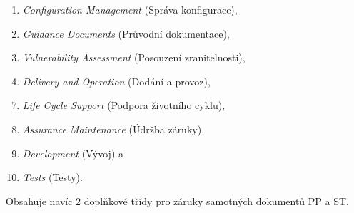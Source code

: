 \documentclass[10pt,a4paper]{article}
\begin{document}
	\begin{minipage}{0.50\textwidth}
		\begin{enumerate}
			\item \textit{Configuration Management} (Správa konfigurace), 
			\item \textit{Guidance Documents} (Průvodní dokumentace), 
			\item \textit{Vulnerability Assessment} (Posouzení zranitelnosti), 
			\item \textit{Delivery and Operation} (Dodání a provoz), 
		\end{enumerate}
	\end{minipage}
	\begin{minipage}{0.44\textwidth}
		\begin{enumerate}\setcounter{enumi}{6} 
			\item \textit{Life Cycle Support} (Podpora životního cyklu), 
			\item \textit{Assurance Maintenance} (Údržba záruky), 
			\item \textit{Development} (Vývoj) a
			\item \textit{Tests} (Testy).
		\end{enumerate}
	\end{minipage}
	
	Obsahuje navíc 2 doplňkové třídy pro záruky samotných dokumentů PP a ST.
\end{document}
